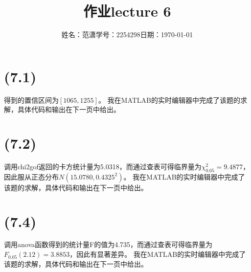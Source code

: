 \documentclass[a4paper]{article}
\title{作业{\hspace{1ex}}lecture 6}
\author{姓名：范潇{\quad}学号：2254298{\quad}日期：\today}
\date{}
\begin{document}
\maketitle
\section{(7.1)}
得到的置信区间为$[1065,1255]$。
我在MATLAB的实时编辑器中完成了该题的求解，具体代码和输出在下一页中给出。
\newpage
\section{(7.2)}
调用chi2gof返回的卡方统计量为5.0318，而通过查表可得临界量为$\chi_{0.05}^2=9.4877$，因此服从正态分布$N(15.0780,0.4325^2)$。
我在MATLAB的实时编辑器中完成了该题的求解，具体代码和输出在下一页中给出。
\newpage
\section{(7.4)}
调用anova函数得到的统计量F的值为4.735，而通过查表可得临界量为$F_{0.05}(2.12)=3.8853$，因此有显著差异。
我在MATLAB的实时编辑器中完成了该题的求解，具体代码和输出在下一页中给出。
\end{document}
